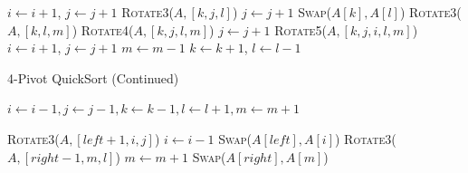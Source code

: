 \documentclass{article}
\begin{document}
\begin{algorithm}[H]
\begin{algorithmic}[1]
                    \State $i \gets i + 1$, $j \gets j + 1$
                    \State \textsc{Rotate3}($A, [k, j, l]$)
                    \State $j \gets j + 1$
                \Else
                    \State \textsc{Swap}($A[k], A[l]$)
                \EndIf
            \Else {}
                    \State \textsc{Rotate3}($A, [k, l, m]$)
                    \State \textsc{Rotate4}($A, [k, j, l, m]$)
                    \State $j \gets j + 1$
                \Else
                    \State \textsc{Rotate5}($A, [k, j, i, l, m]$)
                    \State $i \gets i + 1$, $j \gets j + 1$
                \EndIf
                \State $m \gets m - 1$
            \EndIf
            \State $k \gets k + 1$, $l \gets l - 1$
        \EndIf
    \end{algorithmic}
\end{algorithm}

\begin{algorithm}[H]
    \small
    \caption{4-Pivot QuickSort (Continued)}\label{4PivotQuickSort2}
    \begin{algorithmic}[1]
        \EndWhile
        \State $i \gets i - 1, j \gets j - 1, k \gets k - 1, l \gets l + 1, m \gets m + 1$
        
        \State \textsc{Rotate3}($A, [left + 1, i, j]$)
        \State $i \gets i - 1$
        \State \textsc{Swap}($A[left], A[i]$)
        \State \textsc{Rotate3}($A, [right - 1, m, l]$)
        \State $m \gets m + 1$
        \State \textsc{Swap}($A[right], A[m]$)
        \EndProcedure
    \end{algorithmic}
\end{algorithm}
\end{document}
